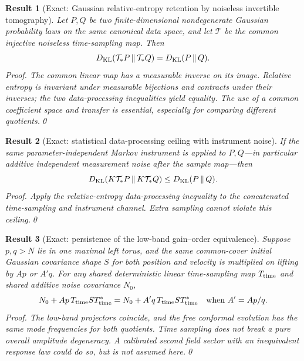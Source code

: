 \documentclass[aps,prd,onecolumn,notitlepage,groupedaddress,11pt]{revtex4-2}
\newtheorem{result}{Result}
\begin{document}
\begin{result}[\textsf{Exact}: Gaussian relative-entropy retention by noiseless invertible tomography]\label{new:187}
Let $P,Q$ be two finite-dimensional nondegenerate Gaussian probability laws on the \emph{same} canonical data space, and let $\mathcal T$ be the common injective noiseless time-sampling map. Then
\begin{equation}\label{new:eq187}
 D_{\rm KL}(\mathcal T_*P\,\|\,\mathcal T_*Q)=D_{\rm KL}(P\,\|\,Q).
\end{equation}
\textit{Proof.} The common linear map has a measurable inverse on its image. Relative entropy is invariant under measurable bijections and contracts under their inverses; the two data-processing inequalities yield equality. The use of a \emph{common} coefficient space and transfer is essential, especially for comparing different quotients.\qed
\end{result}

\begin{result}[\textsf{Exact}: statistical data-processing ceiling with instrument noise]\label{new:188}
If the same parameter-independent Markov instrument is applied to $P,Q$---in particular additive independent measurement noise after the sample map---then
\begin{equation}\label{new:eq188}
 D_{\rm KL}(K\mathcal T_*P\,\|\,K\mathcal T_*Q)\le D_{\rm KL}(P\,\|\,Q).
\end{equation}
\textit{Proof.} Apply the relative-entropy data-processing inequality to the concatenated time-sampling and instrument channel. Extra sampling cannot violate this ceiling.\qed
\end{result}

\begin{result}[\textsf{Exact}: persistence of the low-band gain--order equivalence]\label{new:189}
Suppose $p,q>N$ lie in one maximal left torus, and the same common-cover initial Gaussian covariance shape $S$ for both position and velocity is multiplied on lifting by $A p$ or $A' q$. For any shared deterministic linear time-sampling map $T_{\rm time}$ and shared additive noise covariance $N_0$,
\begin{equation}\label{new:eq189}
 N_0+Ap\,T_{\rm time}ST_{\rm time}^*=N_0+A'q\,T_{\rm time}ST_{\rm time}^*\quad\text{when }A'=Ap/q.
\end{equation}
\textit{Proof.} The low-band projectors coincide, and the free conformal evolution has the same mode frequencies for both quotients. Time sampling does not break a pure overall amplitude degeneracy. A calibrated second field sector with an inequivalent response law could do so, but is not assumed here.\qed
\end{result}
\end{document}
